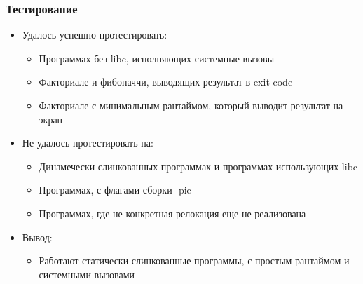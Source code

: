 \documentclass{beamer}
\begin{document}


\begin{frame}[t]
  \frametitle{Тестирование}
  \begin{itemize}
    \item Удалось успешно протестировать:
          \begin{itemize}
            \item Программах без libc, исполняющих системные вызовы
            \item Факториале и фибоначчи, выводящих результат в exit code
            \item Факториале с минимальным рантаймом, который выводит результат на экран
          \end{itemize}
    \item Не удалось протестировать на:
          \begin{itemize}
            \item Динамечески слинкованных программах и программах использующих libc
            \item Программах, с флагами сборки -pie
            \item Программах, где не конкретная релокация еще не реализована
          \end{itemize}
    \item Вывод:
          \begin{itemize}
            \item Работают статически слинкованные программы, с простым рантаймом и системными вызовами
          \end{itemize}
  \end{itemize}
\end{frame}
\end{document}

